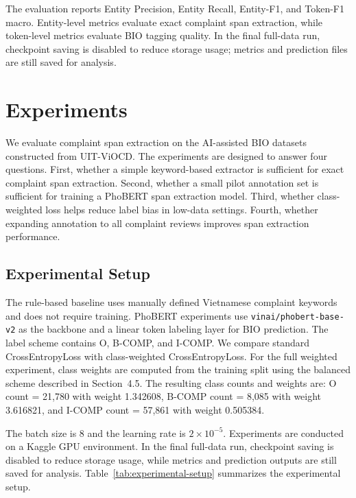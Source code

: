\documentclass[11pt]{article}
\begin{document}
The evaluation reports Entity Precision, Entity Recall, Entity-F1, and Token-F1 macro. Entity-level metrics evaluate exact complaint span extraction, while token-level metrics evaluate BIO tagging quality. In the final full-data run, checkpoint saving is disabled to reduce storage usage; metrics and prediction files are still saved for analysis.

\section{Experiments}

We evaluate complaint span extraction on the AI-assisted BIO datasets constructed from UIT-ViOCD. The experiments are designed to answer four questions. First, whether a simple keyword-based extractor is sufficient for exact complaint span extraction. Second, whether a small pilot annotation set is sufficient for training a PhoBERT span extraction model. Third, whether class-weighted loss helps reduce label bias in low-data settings. Fourth, whether expanding annotation to all complaint reviews improves span extraction performance.

\subsection{Experimental Setup}

The rule-based baseline uses manually defined Vietnamese complaint keywords and does not require training. PhoBERT experiments use \texttt{vinai/phobert-base-v2} as the backbone and a linear token labeling layer for BIO prediction. The label scheme contains O, B-COMP, and I-COMP. We compare standard CrossEntropyLoss with class-weighted CrossEntropyLoss. For the full weighted experiment, class weights are computed from the training split using the balanced scheme described in Section~4.5. The resulting class counts and weights are: O count = 21,780 with weight 1.342608, B-COMP count = 8,085 with weight 3.616821, and I-COMP count = 57,861 with weight 0.505384.

The batch size is 8 and the learning rate is \(2 \times 10^{-5}\). Experiments are conducted on a Kaggle GPU environment. In the final full-data run, checkpoint saving is disabled to reduce storage usage, while metrics and prediction outputs are still saved for analysis. Table~\ref{tab:experimental-setup} summarizes the experimental setup.
\end{document}
